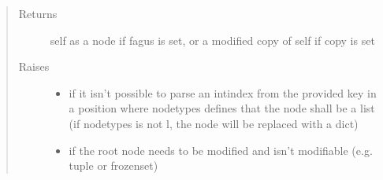 \documentclass[a4paper,10pt,english]{sphinxmanual}
\begin{document}
\begin{fulllineitems}
\begin{fulllineitems}
\begin{quote}
\begin{description}
\begin{itemize}
\end{itemize}

\item[{Returns}] \leavevmode
\sphinxAtStartPar
self as a node if fagus is set, or a modified copy of self if copy is set

\item[{Raises}] \leavevmode\begin{itemize}
\item {}
\sphinxAtStartPar
{} \textendash{} if it isn’t possible to parse an int\sphinxhyphen{}index from the provided key in a position where node\sphinxhyphen{}types
    defines that the node shall be a list (if node\sphinxhyphen{}types is not l, the node will be replaced with a dict)

\item {}
\sphinxAtStartPar
{} \textendash{} if the root node needs to be modified and isn’t modifiable (e.g. tuple or frozenset)

\end{itemize}

\end{description}\end{quote}

\end{fulllineitems}



\end{fulllineitems}
\end{document}
